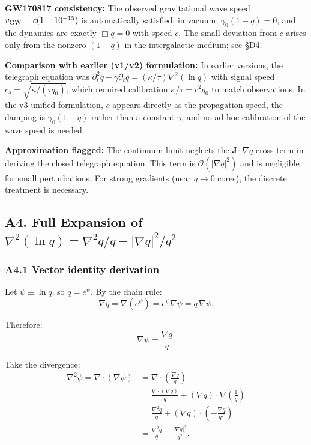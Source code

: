 \documentclass[reprint]{revtex4-2}
\begin{document}
\textbf{GW170817 consistency:} The observed gravitational wave speed $v_{\rm GW} = c(1 \pm 10^{-15})$ is automatically satisfied: in vacuum, $\gamma_0(1-q)=0$, and the dynamics are exactly $\Box q=0$ with speed $c$. The small deviation from $c$ arises only from the nonzero $(1-q)$ in the intergalactic medium; see \S D4.

\textbf{Comparison with earlier (v1/v2) formulation:} In earlier versions, the telegraph equation was $\partial_t^2 q + \gamma\partial_t q = (\kappa/\tau)\nabla^2(\ln q)$ with signal speed $c_s = \sqrt{\kappa/(\tau q_0)}$, which required calibration $\kappa/\tau = c^2 q_0$ to match observations. In the v3 unified formulation, $c$ appears directly as the propagation speed, the damping is $\gamma_0(1-q)$ rather than a constant $\gamma$, and no ad hoc calibration of the wave speed is needed.

\textbf{Approximation flagged:} The continuum limit neglects the $\mathbf{J}\cdot\nabla q$ cross-term in deriving the closed telegraph equation. This term is $\mathcal{O}(|\nabla q|^2)$ and is negligible for small perturbations. For strong gradients (near $q\to 0$ cores), the discrete treatment is necessary.

\subsection{A4. Full Expansion of $\nabla^2(\ln q) = \nabla^2 q/q - |\nabla q|^2/q^2$}

\subsubsection{A4.1 Vector identity derivation}

Let $\psi \equiv \ln q$, so $q = e^\psi$. By the chain rule:
\begin{equation}
\nabla q = \nabla(e^\psi) = e^\psi \nabla\psi = q\,\nabla\psi.
\end{equation}

Therefore:
\begin{equation}
\nabla\psi = \frac{\nabla q}{q}.
\end{equation}

Take the divergence:
\begin{align}
\nabla^2\psi = \nabla\cdot(\nabla\psi) &= \nabla\cdot\left(\frac{\nabla q}{q}\right)\\
&= \frac{\nabla\cdot(\nabla q)}{q} + (\nabla q)\cdot\nabla\left(\frac{1}{q}\right)\\
&= \frac{\nabla^2 q}{q} + (\nabla q)\cdot\left(-\frac{\nabla q}{q^2}\right)\\
&= \frac{\nabla^2 q}{q} - \frac{|\nabla q|^2}{q^2}.
\end{align}
\end{document}
